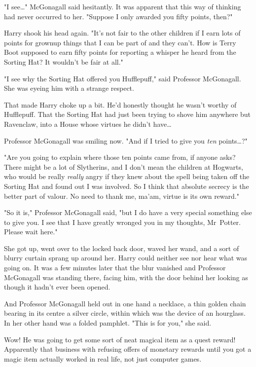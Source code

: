 "I see…" McGonagall said hesitantly. It was apparent that this way of
thinking had never occurred to her. "Suppose I only awarded you fifty points,
then?"

Harry shook his head again. "It's not fair to the other children if I earn lots
of points for grownup things that I can be part of and they can't. How is Terry
Boot supposed to earn fifty points for reporting a whisper he heard from the
Sorting Hat? It wouldn't be fair at all."

"I see why the Sorting Hat offered you Hufflepuff," said Professor McGonagall.
She was eyeing him with a strange respect.

That made Harry choke up a bit. He'd honestly thought he wasn't worthy of
Hufflepuff. That the Sorting Hat had just been trying to shove him anywhere but
Ravenclaw, into a House whose virtues he didn't have…

Professor McGonagall was smiling now. "And if I tried to give you \emph{ten}
points…?"

"Are you going to explain where those ten points came from, if anyone asks?
There might be a lot of Slytherins, and I don't mean the children at Hogwarts,
who would be really \emph{really} angry if they knew about the spell being
taken off the Sorting Hat and found out I was involved. So I think that
absolute secrecy is the better part of valour. No need to thank me, ma'am,
virtue is its own reward."

"So it is," Professor McGonagall said, "but I do have a very special something
else to give you. I see that I have greatly wronged you in my thoughts,
Mr~Potter. Please wait here."

She got up, went over to the locked back door, waved her wand, and a sort of
blurry curtain sprang up around her. Harry could neither see nor hear what was
going on. It was a few minutes later that the blur vanished and Professor
McGonagall was standing there, facing him, with the door behind her looking as
though it hadn't ever been opened.

And Professor McGonagall held out in one hand a necklace, a thin golden chain
bearing in its centre a silver circle, within which was the device of an
hourglass. In her other hand was a folded pamphlet. "This is for you," she said.

Wow! He was going to get some sort of neat magical item as a quest reward!
Apparently that business with refusing offers of monetary rewards until you got
a magic item actually worked in real life, not just computer games.

